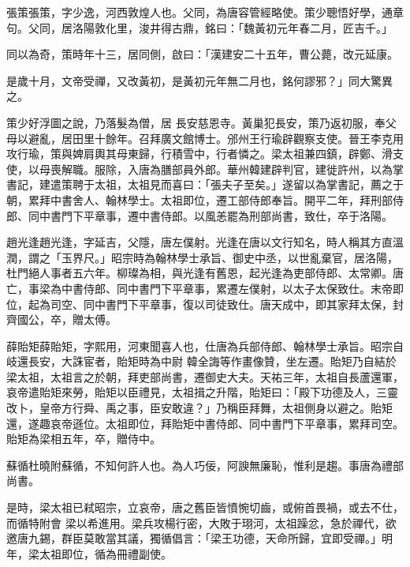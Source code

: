 \begin{pinyinscope}
 張策張策，字少逸，河西敦煌人也。父同，為唐容管經略使。策少聰悟好學，通章句。父同，居洛陽敦化里，浚井得古鼎，銘曰：「魏黃初元年春二月，匠吉千。」



 同以為奇，策時年十三，居同側，啟曰：「漢建安二十五年，曹公薨，改元延康。



 是歲十月，文帝受禪，又改黃初，是黃初元年無二月也，銘何謬邪？」同大驚異之。



 策少好浮圖之說，乃落髮為僧，居
 長安慈恩寺。黃巢犯長安，策乃返初服，奉父母以避亂，居田里十餘年。召拜廣文館博士。邠州王行瑜辟觀察支使。晉王李克用攻行瑜，策與婢肩輿其母東歸，行積雪中，行者憐之。梁太祖兼四鎮，辟鄭、滑支使，以母喪解職。服除，入唐為膳部員外郎。華州韓建辟判官，建徙許州，以為掌書記，建遣策聘于太祖，太祖見而喜曰：「張夫子至矣。」遂留以為掌書記，薦之于朝，累拜中書舍人、翰林學士。太祖即位，遷工部侍郎奉旨。開平二年，拜刑部侍郎、同中書門下平章事，遷中書侍郎。以風恙罷為刑部尚書，致仕，卒于洛陽。



 趙光逢趙光逢，字延吉，父隱，唐左僕射。光逢在唐以文行知名，時人稱其方直溫潤，謂之「玉界尺。」昭宗時為翰林學士承旨、御史中丞，以世亂棄官，居洛陽，杜門絕人事者五六年。柳璨為相，與光逢有舊恩，起光逢為吏部侍郎、太常卿。唐亡，事梁為中書侍郎、同中書門下平章事，累遷左僕射，以太子太保致仕。末帝即位，起為司空、同中書門下平章事，復以司徒致仕。唐天成中，即其家拜太保，封齊國公，卒，贈太傅。



 薛貽矩薛貽矩，字熙用，河東聞喜人也，仕唐為兵部侍郎、翰林學士承旨。昭宗自岐還長安，大誅宦者，貽矩時為中尉
 韓全誨等作畫像贊，坐左遷。貽矩乃自結於梁太祖，太祖言之於朝，拜吏部尚書，遷御史大夫。天祐三年，太祖自長蘆還軍，哀帝遣貽矩來勞，貽矩以臣禮見，太祖揖之升階，貽矩曰：「殿下功德及人，三靈改卜，皇帝方行舜、禹之事，臣安敢違？」乃稱臣拜舞，太祖側身以避之。貽矩還，遂趣哀帝遜位。太祖即位，拜貽矩中書侍郎、同中書門下平章事，累拜司空。貽矩為梁相五年，卒，贈侍中。



 蘇循杜曉附蘇循，不知何許人也。為人巧佞，阿諛無廉恥，惟利是趨。事唐為禮部尚書。



 是時，梁太祖已弒昭宗，立哀帝，唐之舊臣皆憤惋切齒，或俯首畏禍，或去不仕，而循特附會
 梁以希進用。梁兵攻楊行密，大敗于珝河，太祖躁忿，急於禪代，欲邀唐九錫，群臣莫敢當其議，獨循倡言：「梁王功德，天命所歸，宜即受禪。」明年，梁太祖即位，循為冊禮副使。




\end{pinyinscope}
